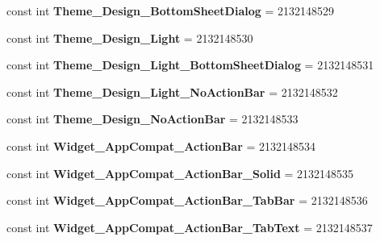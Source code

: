 \begin{DoxyCompactItemize}
const int {\bfseries Theme\+\_\+\+Design\+\_\+\+Bottom\+Sheet\+Dialog} = 2132148529
\item 
\mbox{\label{classst_delivery_1_1_resource_1_1_style_a0db54fd199de504dd8f9d166b02aee69}} 
const int {\bfseries Theme\+\_\+\+Design\+\_\+\+Light} = 2132148530
\item 
\mbox{\label{classst_delivery_1_1_resource_1_1_style_a1e1a01af76af972d44e677f6a96ccc7c}} 
const int {\bfseries Theme\+\_\+\+Design\+\_\+\+Light\+\_\+\+Bottom\+Sheet\+Dialog} = 2132148531
\item 
\mbox{\label{classst_delivery_1_1_resource_1_1_style_a967a2a73a87a22a0d0b5d04db53ebd9f}} 
const int {\bfseries Theme\+\_\+\+Design\+\_\+\+Light\+\_\+\+No\+Action\+Bar} = 2132148532
\item 
\mbox{\label{classst_delivery_1_1_resource_1_1_style_a03c31491b0af107c28919852b1a2d8f2}} 
const int {\bfseries Theme\+\_\+\+Design\+\_\+\+No\+Action\+Bar} = 2132148533
\item 
\mbox{\label{classst_delivery_1_1_resource_1_1_style_a8171f90358fd0933af376a81947e007f}} 
const int {\bfseries Widget\+\_\+\+App\+Compat\+\_\+\+Action\+Bar} = 2132148534
\item 
\mbox{\label{classst_delivery_1_1_resource_1_1_style_a7b9a05b2f4ba7358c67ba6b841bed56c}} 
const int {\bfseries Widget\+\_\+\+App\+Compat\+\_\+\+Action\+Bar\+\_\+\+Solid} = 2132148535
\item 
\mbox{\label{classst_delivery_1_1_resource_1_1_style_a9b212803775d816884afb17c0035e729}} 
const int {\bfseries Widget\+\_\+\+App\+Compat\+\_\+\+Action\+Bar\+\_\+\+Tab\+Bar} = 2132148536
\item 
\mbox{\label{classst_delivery_1_1_resource_1_1_style_aedeacb9e5ac007f5f91cb043f39b16c2}} 
const int {\bfseries Widget\+\_\+\+App\+Compat\+\_\+\+Action\+Bar\+\_\+\+Tab\+Text} = 2132148537
\item 

\end{DoxyCompactItemize}
